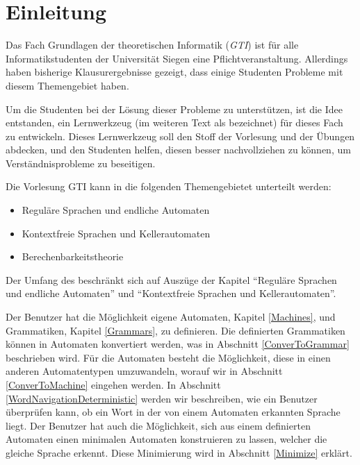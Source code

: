 



\chapter{Einleitung}\label{Introduction}

Das Fach Grundlagen der theoretischen Informatik (\textit{GTI}) ist für alle
Informatikstudenten der Universität Siegen eine Pflichtveranstaltung. Allerdings
haben bisherige Klausurergebnisse gezeigt, dass einige Studenten Probleme mit
diesem Themengebiet haben.\vspace{10pt}

Um die Studenten bei der Lösung dieser Probleme zu unterstützen, ist die Idee
entstanden, ein Lernwerkzeug (im weiteren Text als \textit{\gtitool} bezeichnet)
für dieses Fach zu entwickeln. Dieses Lernwerkzeug soll den Stoff der Vorlesung
und der Übungen abdecken, und den Studenten helfen, diesen besser
nachvollziehen zu können, um Verständnisprobleme zu beseitigen.\vspace{10pt}

\noindent
Die Vorlesung GTI kann in die folgenden Themengebietet unterteilt
werden:\vspace{10pt} 

\begin{itemize}
  \item Reguläre Sprachen und endliche Automaten
  \item Kontextfreie Sprachen und Kellerautomaten
  \item Berechenbarkeitstheorie
\end{itemize}\vspace{10pt}

\noindent
Der Umfang des \gtitools beschränkt sich auf Auszüge der Kapitel
"`Reguläre Sprachen und endliche Automaten"' und "`Kontextfreie Sprachen und
Kellerautomaten"'.\vspace{10pt}

Der Benutzer hat die Möglichkeit eigene Automaten, Kapitel \ref{Machines}, und
Grammatiken, Kapitel \ref{Grammars},  zu definieren. Die definierten Grammatiken
können in Automaten konvertiert werden, was in Abschnitt \ref{ConverToGrammar}
beschrieben wird. Für die Automaten besteht die Möglichkeit, diese in einen
anderen Automatentypen umzuwandeln, worauf wir in Abschnitt \ref{ConverToMachine}
eingehen werden. In Abschnitt \ref{WordNavigationDeterministic} werden wir
beschreiben, wie ein Benutzer überprüfen kann, ob ein Wort in der von einem
Automaten erkannten Sprache liegt. Der Benutzer hat auch die Möglichkeit, sich
aus einem definierten Automaten einen minimalen Automaten konstruieren zu lassen,
welcher die gleiche Sprache erkennt. Diese Minimierung wird in Abschnitt
\ref{Minimize} erklärt.\vspace{10pt}

